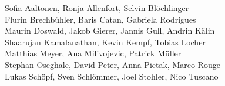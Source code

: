 %
%
%
Sofia Aaltonen,		%
Ronja Allenfort,	%
Selvin Blöchlinger%
\\
Flurin Brechbühler,	%
Baris Catan,		%
Gabriela Rodrigues%
\\
Maurin Doswald,		%
Jakob Gierer,		%
Jannis Gull,		%
Andrin Kälin%
\\
Shaarujan Kamalanathan,	%
Kevin Kempf,		%
Tobias Locher%
\\
Matthias Meyer,		%
Ana Milivojevic,	%
Patrick Müller%
\\
Stephan Oseghale,	%
David Peter,		%
Anna Pietak,		%
Marco Rouge%
\\
Lukas Schöpf,		%
Sven Schlömmer,		%
Joel Stohler,		%
Nico Tuscano%
